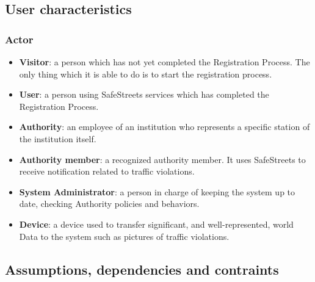 \documentclass[12pt]{article}
\begin{document}
\subsection{User characteristics}
\vspace{5mm}
\subsubsection{Actor}
\vspace{2mm}
\begin{itemize}
\item \textbf{Visitor}: a person which has
not yet completed the Registration Process. The only thing which it is able to do is to start the registration process. 

\item \textbf{User}: a person using SafeStreets services which has completed the Registration Process. 

\item \textbf{Authority}: an employee of an institution who represents a specific station of the institution itself. 

\item \textbf{Authority member}: a recognized authority member. It uses SafeStreets to receive notification related to traffic violations.

\item \textbf{System Administrator}: a person in charge of keeping the system up to date, checking Authority policies and behaviors.

\item \textbf{Device}: a device used to transfer significant, and well-represented, world Data to the system such as pictures of traffic violations.
\end{itemize}


\subsection{Assumptions, dependencies and contraints}
\vspace{5mm}
\end{document}
